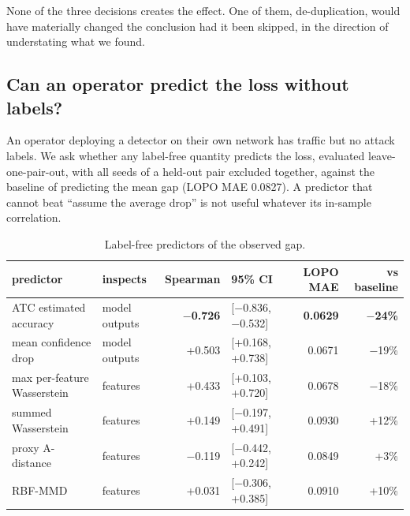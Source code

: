 \documentclass[11pt,a4paper]{article}
\begin{document}
None of the three decisions creates the effect. One of them, de-duplication, would have materially changed the conclusion had it been skipped, in the direction of understating what we found.

\subsection{Can an operator predict the loss without labels?}

An operator deploying a detector on their own network has traffic but no attack labels. We ask whether any label-free quantity predicts the loss, evaluated leave-one-pair-out, with all seeds of a held-out pair excluded together, against the baseline of predicting the mean gap (LOPO MAE 0.0827). A predictor that cannot beat ``assume the average drop'' is not useful whatever its in-sample correlation.

\begin{table}[htbp]\centering\small
\caption{Label-free predictors of the observed gap.}
\begin{tabular}{llrlrr}
\toprule
predictor & inspects & Spearman & 95\% CI & LOPO MAE & vs baseline \\
\midrule
ATC estimated accuracy & model outputs & \textbf{$-$0.726} & [$-$0.836, $-$0.532] & \textbf{0.0629} & \textbf{$-$24\%} \\
mean confidence drop & model outputs & +0.503 & [+0.168, +0.738] & 0.0671 & $-$19\% \\
max per-feature Wasserstein & features & +0.433 & [+0.103, +0.720] & 0.0678 & $-$18\% \\
summed Wasserstein & features & +0.149 & [$-$0.197, +0.491] & 0.0930 & +12\% \\
proxy A-distance & features & $-$0.119 & [$-$0.442, +0.242] & 0.0849 & +3\% \\
RBF-MMD & features & +0.031 & [$-$0.306, +0.385] & 0.0910 & +10\% \\
\bottomrule
\end{tabular}
\end{table}
\end{document}
